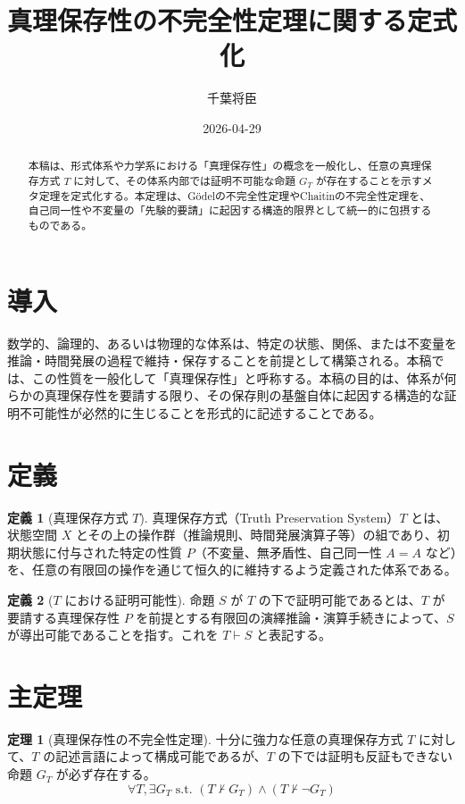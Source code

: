 \documentclass[11pt,a4paper]{article}
\title{真理保存性の不完全性定理に関する定式化}
\author{千葉将臣}
\date{2026-04-29}
\theoremstyle{definition}
\newtheorem{definition}{定義}[section]
\newtheorem{theorem}{定理}[section]
\begin{document}
\maketitle

\begin{abstract}
本稿は、形式体系や力学系における「真理保存性」の概念を一般化し、任意の真理保存方式 $T$ に対して、その体系内部では証明不可能な命題 $G_T$ が存在することを示すメタ定理を定式化する。本定理は、Gödelの不完全性定理やChaitinの不完全性定理を、自己同一性や不変量の「先験的要請」に起因する構造的限界として統一的に包摂するものである。
\end{abstract}

\section{導入}
数学的、論理的、あるいは物理的な体系は、特定の状態、関係、または不変量を推論・時間発展の過程で維持・保存することを前提として構築される。本稿では、この性質を一般化して「真理保存性」と呼称する。本稿の目的は、体系が何らかの真理保存性を要請する限り、その保存則の基盤自体に起因する構造的な証明不可能性が必然的に生じることを形式的に記述することである。

\section{定義}

\begin{definition}[真理保存方式 $T$]
真理保存方式（Truth Preservation System）$T$ とは、状態空間 $X$ とその上の操作群（推論規則、時間発展演算子等）の組であり、初期状態に付与された特定の性質 $P$（不変量、無矛盾性、自己同一性 $A=A$ など）を、任意の有限回の操作を通じて恒久的に維持するよう定義された体系である。
\end{definition}

\begin{definition}[$T$ における証明可能性]
命題 $S$ が $T$ の下で証明可能であるとは、$T$ が要請する真理保存性 $P$ を前提とする有限回の演繹推論・演算手続きによって、$S$ が導出可能であることを指す。これを $T \vdash S$ と表記する。
\end{definition}

\section{主定理}

\begin{theorem}[真理保存性の不完全性定理]
\label{thm:incompleteness}
十分に強力な任意の真理保存方式 $T$ に対して、$T$ の記述言語によって構成可能であるが、$T$ の下では証明も反証もできない命題 $G_T$ が必ず存在する。
\[
\forall T, \exists G_T \text{ s.t. } (T \nvdash G_T) \land (T \nvdash \neg G_T)
\]
\end{theorem}
\end{document}
